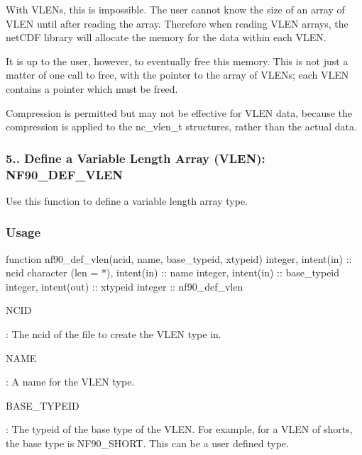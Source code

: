 With V\+L\+E\+Ns, this is impossible. The user cannot know the size of an array of V\+L\+EN until after reading the array. Therefore when reading V\+L\+EN arrays, the net\+C\+DF library will allocate the memory for the data within each V\+L\+EN.

It is up to the user, however, to eventually free this memory. This is not just a matter of one call to free, with the pointer to the array of V\+L\+E\+Ns; each V\+L\+EN contains a pointer which must be freed.

Compression is permitted but may not be effective for V\+L\+EN data, because the compression is applied to the nc\+\_\+vlen\+\_\+t structures, rather than the actual data.\hypertarget{f90-user-defined-data-types_f90-define-a-variable-length-array-vlen-nf90_def_vlen}{}\subsubsection{5.. Define a Variable Length Array (\+V\+L\+E\+N)\+: N\+F90\+\_\+\+D\+E\+F\+\_\+\+V\+L\+EN}\label{f90-user-defined-data-types_f90-define-a-variable-length-array-vlen-nf90_def_vlen}
Use this function to define a variable length array type.

\subsubsection*{Usage}


\begin{DoxyCode}
\textcolor{keyword}{function }nf90\_def\_vlen(ncid, name, base\_typeid, xtypeid)
  \textcolor{keywordtype}{integer}, \textcolor{keywordtype}{intent(in)} :: ncid
  \textcolor{keywordtype}{character (len = *)}, \textcolor{keywordtype}{intent(in)} :: name
  \textcolor{keywordtype}{integer}, \textcolor{keywordtype}{intent(in)} :: base\_typeid
  \textcolor{keywordtype}{integer}, \textcolor{keywordtype}{intent(out)} :: xtypeid
  \textcolor{keywordtype}{integer} :: nf90\_def\_vlen
\end{DoxyCode}


{\ttfamily N\+C\+ID}

\+: The ncid of the file to create the V\+L\+EN type in.

{\ttfamily N\+A\+ME}

\+: A name for the V\+L\+EN type.

{\ttfamily B\+A\+S\+E\+\_\+\+T\+Y\+P\+E\+ID}

\+: The typeid of the base type of the V\+L\+EN. For example, for a V\+L\+EN of shorts, the base type is N\+F90\+\_\+\+S\+H\+O\+RT. This can be a user defined type.

